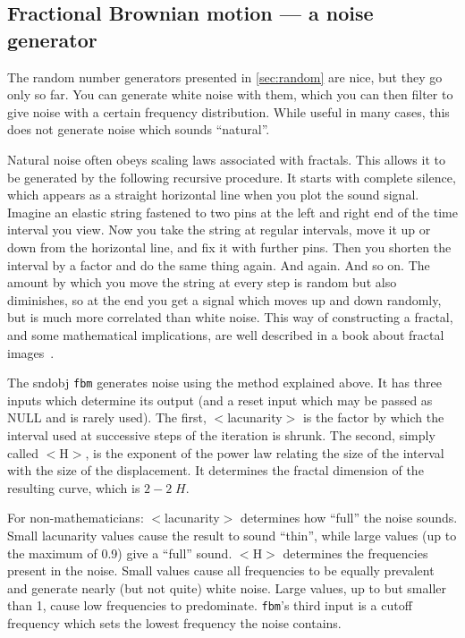 \documentclass{article}
\begin{document}
\subsection{Fractional Brownian motion --- a noise generator}

The random number generators presented in \autoref{sec:random} are nice, but
they go only so far.  You can generate white noise with them, which you can
then filter to give noise with a certain frequency distribution.  While useful
in many cases, this does not generate noise which sounds ``natural''.

Natural noise often obeys scaling laws associated with fractals.  This allows
it to be generated by the following recursive procedure.  It starts with
complete silence, which appears as a straight horizontal line when you plot the
sound signal.  Imagine an elastic string fastened to two pins at the left and
right end of the time interval you view.  Now you take the string at regular
intervals, move it up or down from the horizontal line, and fix it with further
pins.  Then you shorten the interval by a factor and do the same thing again.
And again.  And so on.  The amount by which you move the string at every step
is random but also diminishes, so at the end you get a signal which moves up
and down randomly, but is much more correlated than white noise.  This way of
constructing a fractal, and some mathematical implications, are well described
in a book about fractal images~\cite{sfi}.

The sndobj {\tt fbm} generates noise using the method explained above.  It has
three inputs which determine its output (and a reset input which may be passed
as NULL and is rarely used).  The first, $<$lacunarity$>$ is the factor by
which the interval used at successive steps of the iteration is shrunk.  The
second, simply called $<$H$>$, is the exponent of the power law relating the
size of the interval with the size of the displacement.  It determines the
fractal dimension of the resulting curve, which is $2-2\;H$.

For non-mathematicians: $<$lacunarity$>$ determines how ``full'' the noise
sounds.  Small lacunarity values cause the result to sound ``thin'', while
large values (up to the maximum of 0.9) give a ``full'' sound.  $<$H$>$
determines the frequencies present in the noise.  Small values cause all
frequencies to be equally prevalent and generate nearly
(but not quite) white noise.  Large values, up to but smaller than 1, cause low
frequencies to predominate.  {\tt fbm}'s third input is a cutoff frequency
which sets the lowest frequency the noise contains.
\end{document}
